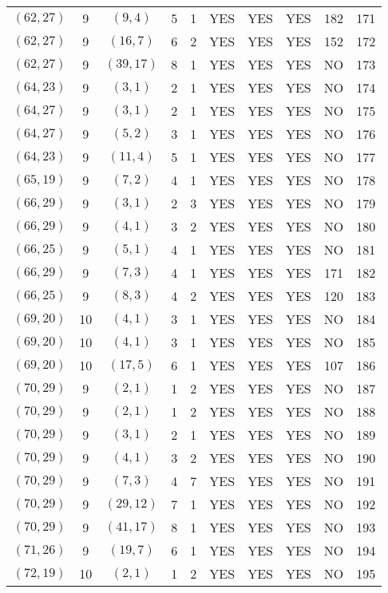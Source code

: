 \begin{longtable}{|c|c|c|c|c|c|c|c|c|c|}
$(62, 27)$ & 9 & $(9, 4)$ & 5 & 1 & YES & YES & YES & 182 & 171\\
$(62, 27)$ & 9 & $(16, 7)$ & 6 & 2 & YES & YES & YES & 152 & 172\\
$(62, 27)$ & 9 & $(39, 17)$ & 8 & 1 & YES & YES & YES & NO & 173\\
$(64, 23)$ & 9 & $(3, 1)$ & 2 & 1 & YES & YES & YES & NO & 174\\
$(64, 27)$ & 9 & $(3, 1)$ & 2 & 1 & YES & YES & YES & NO & 175\\
$(64, 27)$ & 9 & $(5, 2)$ & 3 & 1 & YES & YES & YES & NO & 176\\
$(64, 23)$ & 9 & $(11, 4)$ & 5 & 1 & YES & YES & YES & NO & 177\\
$(65, 19)$ & 9 & $(7, 2)$ & 4 & 1 & YES & YES & YES & NO & 178\\
$(66, 29)$ & 9 & $(3, 1)$ & 2 & 3 & YES & YES & YES & NO & 179\\
$(66, 29)$ & 9 & $(4, 1)$ & 3 & 2 & YES & YES & YES & NO & 180\\
$(66, 25)$ & 9 & $(5, 1)$ & 4 & 1 & YES & YES & YES & NO & 181\\
$(66, 29)$ & 9 & $(7, 3)$ & 4 & 1 & YES & YES & YES & 171 & 182\\
$(66, 25)$ & 9 & $(8, 3)$ & 4 & 2 & YES & YES & YES & 120 & 183\\
$(69, 20)$ & 10 & $(4, 1)$ & 3 & 1 & YES & YES & YES & NO & 184\\
$(69, 20)$ & 10 & $(4, 1)$ & 3 & 1 & YES & YES & YES & NO & 185\\
$(69, 20)$ & 10 & $(17, 5)$ & 6 & 1 & YES & YES & YES & 107 & 186\\
$(70, 29)$ & 9 & $(2, 1)$ & 1 & 2 & YES & YES & YES & NO & 187\\
$(70, 29)$ & 9 & $(2, 1)$ & 1 & 2 & YES & YES & YES & NO & 188\\
$(70, 29)$ & 9 & $(3, 1)$ & 2 & 1 & YES & YES & YES & NO & 189\\
$(70, 29)$ & 9 & $(4, 1)$ & 3 & 2 & YES & YES & YES & NO & 190\\
$(70, 29)$ & 9 & $(7, 3)$ & 4 & 7 & YES & YES & YES & NO & 191\\
$(70, 29)$ & 9 & $(29, 12)$ & 7 & 1 & YES & YES & YES & NO & 192\\
$(70, 29)$ & 9 & $(41, 17)$ & 8 & 1 & YES & YES & YES & NO & 193\\
$(71, 26)$ & 9 & $(19, 7)$ & 6 & 1 & YES & YES & YES & NO & 194\\
$(72, 19)$ & 10 & $(2, 1)$ & 1 & 2 & YES & YES & YES & NO & 195\\

\end{longtable}
